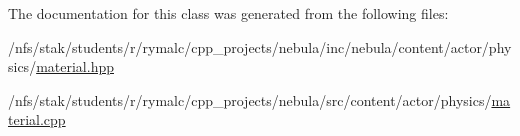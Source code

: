 The documentation for this class was generated from the following files:\begin{DoxyCompactItemize}
\item 
/nfs/stak/students/r/rymalc/cpp\_\-projects/nebula/inc/nebula/content/actor/physics/\hyperlink{physics_2material_8hpp}{material.hpp}\item 
/nfs/stak/students/r/rymalc/cpp\_\-projects/nebula/src/content/actor/physics/\hyperlink{material_8cpp}{material.cpp}\end{DoxyCompactItemize}
